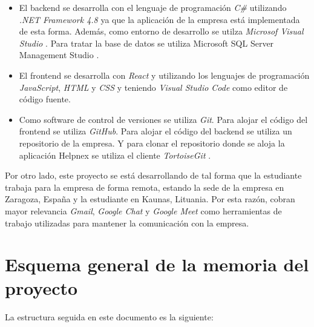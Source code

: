 \begin{itemize}
    \item El backend se desarrolla con el lenguaje de programación \textit{C\#} utilizando \textit{.NET Framework 4.8} \cite{net-framework} ya que la aplicación de la empresa está implementada de esta forma. Además, como entorno de desarrollo se utilza \textit{Microsof Visual Studio} \cite{vs}. Para tratar la base de datos se utiliza Microsoft SQL Server Management Studio \cite{sql-server-studio}.
    \item El frontend se desarrolla con \textit{React} \cite{react} y utilizando los lenguajes de programación \textit{JavaScript}, \textit{HTML} y \textit{CSS} y teniendo \textit{Visual Studio Code} \cite{vscode} como editor de código fuente.
    \item Como software de control de versiones se utiliza \textit{Git}. Para alojar el código del frontend se utiliza \textit{GitHub}. Para alojar el código del backend se utiliza un repositorio de la empresa. Y para clonar el repositorio donde se aloja la aplicación Helpnex se utiliza el cliente \textit{TortoiseGit} \cite{tortoise-git}.
\end{itemize}

Por otro lado, este proyecto se está desarrollando de tal forma que la estudiante trabaja para la empresa de forma remota, estando la sede de la empresa en Zaragoza, España y la estudiante en Kaunas, Lituania. Por esta razón, cobran mayor relevancia \textit{Gmail}, \textit{Google Chat} y \textit{Google Meet} como herramientas de trabajo utilizadas para mantener la comunicación con la empresa.

\section{Esquema general de la memoria del proyecto}


La estructura seguida en este documento es la siguiente:

